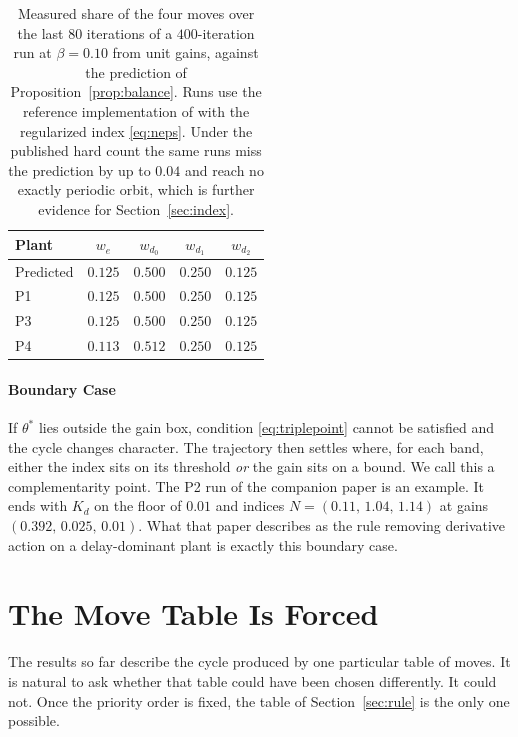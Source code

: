 \documentclass[letterpaper, 10pt, conference, twocolumn]{ieeeconf}
\begin{document}
\begin{table}[t]
\small
\centering
\caption{Measured share of the four moves over the last $80$ iterations of a
$400$-iteration run at $\beta = 0.10$ from unit gains, against the prediction
of Proposition~\ref{prop:balance}. Runs use the reference implementation
of \cite{Paper1} with the regularized index \eqref{eq:neps}. Under the
published hard count the same runs miss the prediction by up to $0.04$ and
reach no exactly periodic orbit, which is further evidence for
Section~\ref{sec:index}.}
\label{tab:duty}
\begin{tabular}{lcccc}
\toprule
Plant & $w_e$ & $w_{d_0}$ & $w_{d_1}$ & $w_{d_2}$ \\
\midrule
Predicted & $0.125$ & $0.500$ & $0.250$ & $0.125$ \\
\midrule
P1 & $0.125$ & $0.500$ & $0.250$ & $0.125$ \\
P3 & $0.125$ & $0.500$ & $0.250$ & $0.125$ \\
P4 & $0.113$ & $0.512$ & $0.250$ & $0.125$ \\
\bottomrule
\end{tabular}
\end{table}

\paragraph{Boundary Case} If $\theta^*$ lies outside the gain box, condition
\eqref{eq:triplepoint} cannot be satisfied and the cycle changes character.
The trajectory then settles where, for each band, either the index sits on its
threshold \emph{or} the gain sits on a bound. We call this a complementarity
point. The P2 run of the companion paper is an example. It ends with $K_d$ on
the floor of $0.01$ and indices $N = (0.11,\, 1.04,\, 1.14)$ at gains
$(0.392,\, 0.025,\, 0.01)$. What that paper describes as the rule removing
derivative action on a delay-dominant plant is exactly this boundary case.

\section{The Move Table Is Forced}
\label{sec:why}

The results so far describe the cycle produced by one particular table of
moves. It is natural to ask whether that table could have been chosen
differently. It could not. Once the priority order is fixed, the table of
Section~\ref{sec:rule} is the only one possible.
\end{document}
